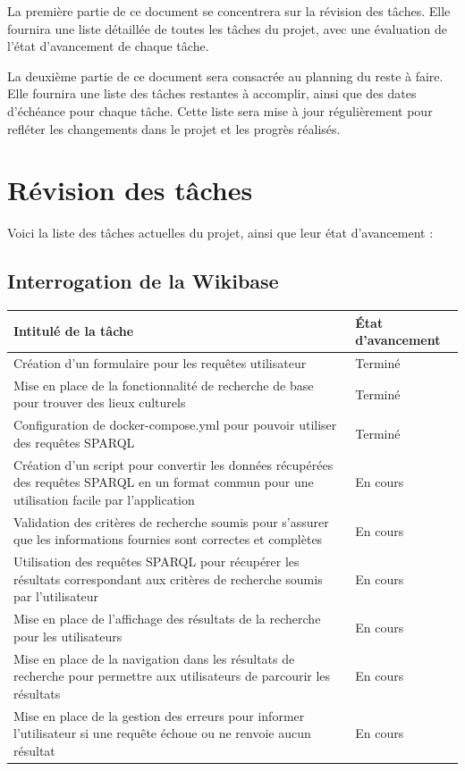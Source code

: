 \documentclass[a4paper, 12pt]{article}
\begin{document}
La première partie de ce document se concentrera sur la révision des tâches. Elle fournira une liste détaillée de toutes les tâches du projet, avec une évaluation de l'état d'avancement de chaque tâche. 

La deuxième partie de ce document sera consacrée au planning du reste à faire. Elle fournira une liste des tâches restantes à accomplir, ainsi que des dates d'échéance pour chaque tâche. Cette liste sera mise à jour régulièrement pour refléter les changements dans le projet et les progrès réalisés. 

\section{Révision des tâches}

Voici la liste des tâches actuelles du projet, ainsi que leur état d'avancement :

\subsection{Interrogation de la Wikibase}

\begin{center}
    
\begin{tabular}{|p{14cm}|p{3cm}|}
\hline
\rowcolor[HTML]{EFEFEF}
Intitulé de la tâche & État d'avancement \\ 
\hline
Création d'un formulaire pour les requêtes utilisateur & Terminé \\
\hline
Mise en place de la fonctionnalité de recherche de base pour trouver des lieux culturels & Terminé \\
\hline
Configuration de docker-compose.yml pour pouvoir utiliser des requêtes SPARQL & Terminé \\
\hline
Création d'un script pour convertir les données récupérées des requêtes SPARQL en un format commun pour une utilisation facile par l'application & En cours \\
\hline
Validation des critères de recherche soumis pour s'assurer que les informations fournies sont correctes et complètes & En cours \\
\hline
Utilisation des requêtes SPARQL pour récupérer les résultats correspondant aux critères de recherche soumis par l'utilisateur & En cours \\
\hline
Mise en place de l'affichage des résultats de la recherche pour les utilisateurs & En cours \\
\hline
Mise en place de la navigation dans les résultats de recherche pour permettre aux utilisateurs de parcourir les résultats & En cours \\
\hline
Mise en place de la gestion des erreurs pour informer l'utilisateur si une requête échoue ou ne renvoie aucun résultat & En cours \\ \hline
\end{tabular}
\end{center}
\newpage
\end{document}

